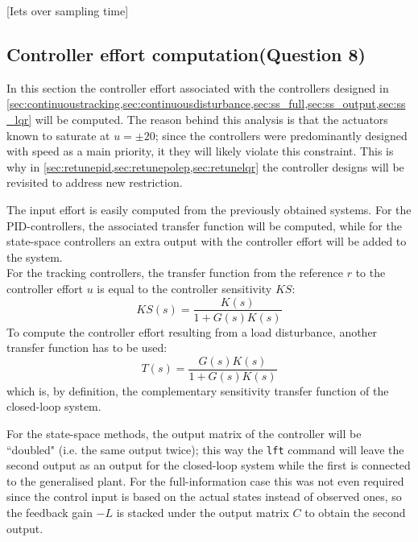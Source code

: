 [Iets over sampling time]
\subsection{Controller effort computation\textnormal{\phantom{xxx}(Question 8)}}
In this section the controller effort associated with the controllers designed in \cref{sec:continuoustracking,sec:continuousdisturbance,sec:ss_full,sec:ss_output,sec:ss_lqr} will be computed. The reason behind this analysis is that the actuators known to saturate at $u = \pm20$; since the controllers were predominantly designed with speed as a main priority, it they will likely violate this constraint. This is why in \cref{sec:retunepid,sec:retunepolep,sec:retunelqr} the controller designs will be revisited to address new restriction.

The input effort is easily computed from the previously obtained systems. For the PID-controllers, the associated transfer function will be computed, while for the state-space controllers an extra output with the controller effort will be added to the system.\\
\indent For the tracking controllers, the transfer function from the reference $r$ to the controller effort $u$ is equal to the controller sensitivity $KS$:
$$ KS(s) = \frac{K(s)}{1 + G(s)K(s)} $$
To compute the controller effort resulting from a load disturbance, another transfer function has to be used:
$$ T(s) = \frac{G(s)K(s)}{1 + G(s)K(s)}$$
which is, by definition, the complementary sensitivity transfer function of the closed-loop system. 

For the state-space methods, the output matrix of the controller will be ``doubled" (i.e. the same output twice); this way the \texttt{lft} command will leave the second output as an output for the closed-loop system while the first is connected to the generalised plant. For the full-information case this was not even required since the control input is based on the actual states instead of observed ones, so the feedback gain $-L$ is stacked under the output matrix $C$ to obtain the second output.

